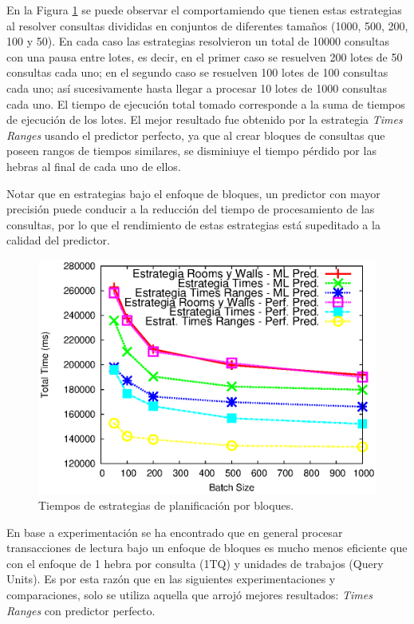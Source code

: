 En la Figura \ref{fig:scheduler_all_16threads} se puede observar el comportamiendo que tienen estas estrategias al resolver consultas divididas en conjuntos de diferentes tamaños (1000, 500, 200, 100 y 50). En cada caso las estrategias resolvieron un total de 10000 consultas con una pausa entre lotes, es decir, en el primer caso se resuelven 200 lotes de 50 consultas cada uno; en el segundo caso se resuelven 100 lotes de 100 consultas cada uno; así sucesivamente hasta llegar a procesar 10 lotes de 1000 consultas cada uno. El tiempo de ejecución total tomado corresponde a la suma de tiempos de ejecución de los lotes. El mejor resultado fue obtenido por la estrategia \textit{Times Ranges} usando el predictor perfecto, ya que al crear bloques de consultas que poseen rangos de tiempos similares, se disminiuye el tiempo pérdido por las hebras al final de cada uno de ellos.

Notar que en estrategias bajo el enfoque de bloques, un predictor con mayor precisión puede conducir a la reducción del tiempo de procesamiento de las consultas, por lo que el rendimiento de estas estrategias está supeditado a la calidad del predictor. 

\begin{figure}[tp]
\centering
\includegraphics[scale=.75]{images/scheduler_all_16threads.eps}
\caption{Tiempos de estrategias de planificación por bloques.}
\label{fig:scheduler_all_16threads}
\end{figure}

En base a experimentación se ha encontrado que en general procesar transacciones de lectura bajo un enfoque de bloques \citep{Ye:2007} es mucho menos eficiente que con el enfoque de 1 hebra por consulta (1TQ) y unidades de trabajos (Query Units). Es por esta razón que en las siguientes experimentaciones y comparaciones, solo se utiliza aquella que arrojó mejores resultados: \textit{Times Ranges} con predictor perfecto.

